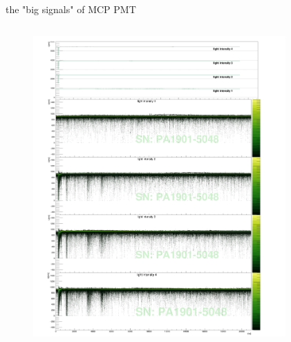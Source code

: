 \documentclass[11pt,compress,xcolor=x11names,UTF8]{beamer}
\begin{document}
\begin{frame}{the "big signals" of MCP PMT}
\vspace{-1.3cm}
\begin{columns}
\begin{column}{.485\textwidth}
\begin{figure}
\centering
	\includegraphics[width=1.049\textwidth]{figure/PA1901-5048_avewave}
\end{figure}
\end{column}
\begin{column}{.485\textwidth}
\begin{figure}
\centering

\end{figure}
\end{column}
\end{columns}
\end{frame}
\end{document}
